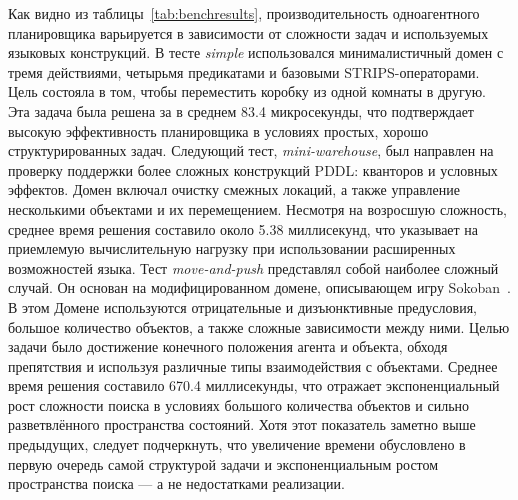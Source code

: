 Как видно из таблицы~\ref{tab:benchresults},
производительность одноагентного планировщика варьируется
в зависимости от сложности задач и используемых языковых конструкций.
В тесте \textit{simple} использовался минималистичный домен с тремя действиями,
четырьмя предикатами и базовыми STRIPS-операторами.
Цель состояла в том, чтобы переместить коробку
из одной комнаты в другую.
Эта задача была решена за в среднем 83.4 микросекунды,
что подтверждает высокую эффективность планировщика
в условиях простых, хорошо структурированных задач.
Следующий тест, \textit{mini-warehouse}, был направлен на проверку поддержки
более сложных конструкций PDDL: кванторов и условных эффектов.
Домен включал очистку смежных локаций,
а также управление несколькими объектами и их перемещением.
Несмотря на возросшую сложность, среднее время решения составило около 5.38 миллисекунд,
что указывает на приемлемую вычислительную нагрузку
при использовании расширенных возможностей языка.
Тест \textit{move-and-push} представлял собой наиболее сложный случай.
Он основан на модифицированном домене, описывающем игру Sokoban~\cite{enwiki:sokoban}.
В этом Домене используются отрицательные и дизъюнктивные предусловия,
большое количество объектов, а также сложные зависимости между ними.
Целью задачи было достижение конечного положения агента и объекта,
обходя препятствия и используя различные типы взаимодействия с объектами.
Среднее время решения составило 670.4 миллисекунды,
что отражает экспоненциальный рост сложности поиска в условиях
большого количества объектов и сильно разветвлённого пространства состояний.
Хотя этот показатель заметно выше предыдущих,
следует подчеркнуть, что увеличение времени обусловлено
в первую очередь самой структурой задачи и экспоненциальным ростом
пространства поиска --- а не недостатками реализации.

